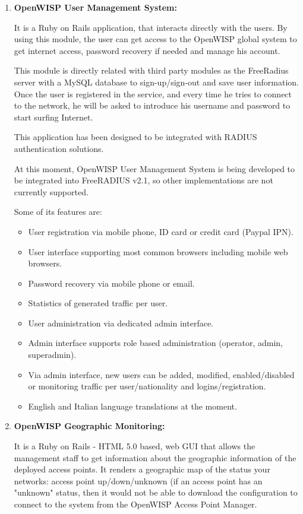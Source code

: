 \documentclass[draftclsnofoot,12pt,journal,onecolumn]{IEEEtran}
\begin{document}
\begin{enumerate}
\item[\fbox{1}] \textbf{OpenWISP User Management System:} 

It is a Ruby on Rails application, that interacts directly with the users. By using this module, the user can get access to the OpenWISP global system to get internet access, password recovery if needed and manage his account.

This module is directly related with third party modules as the FreeRadius server with a MySQL database to sign-up/sign-out and save user information. Once the user is registered in the service, and every time he tries to connect to the network, he will be asked to introduce his username and password to start surfing Internet.

This application has been designed to be integrated with RADIUS authentication solutions.

At this moment, OpenWISP User Management System is being developed to be integrated into FreeRADIUS v2.1, so other implementations are not currently supported.

Some of its features are:
\begin{itemize}
\item User registration via mobile phone, ID card or credit card (Paypal IPN).
\item User interface supporting most common browsers including mobile web browsers.
\item Password recovery via mobile phone or email.
\item Statistics of generated traffic per user.
\item User administration via dedicated admin interface.
\item Admin interface supports role based administration (operator, admin, superadmin).
\item Via admin interface, new users can be added, modified, enabled/disabled or monitoring traffic per user/nationality and logins/registration.
\item English and Italian language translations at the moment.
\end{itemize}

\item[\fbox{2}] \textbf{OpenWISP Geographic Monitoring:}

It is a Ruby on Rails - HTML 5.0 based, web GUI that allows the management staff to get information about the geographic information of the deployed access points. It renders a geographic map of the status your networks: access point up/down/unknown (if an access point has an "unknown" status, then it would not be able to download the configuration to connect to the system from the OpenWISP Access Point Manager. \\


\end{enumerate}
\end{document}
